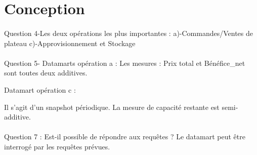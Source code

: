 \section{Conception}

\paragraph{} Question 4-Les deux opérations les plus importantes : 
a)-Commandes/Ventes de plateau
c)-Approvisionnement et Stockage 








\paragraph{} Question 5- Datamarts opération a : 
Les mesures : Prix total et Bénéfice_net sont toutes deux additives.


Datamart opération c :
 


Il s’agit d’un snapshot périodique.
La mesure de capacité restante est semi-additive.

\paragraph{} Question 7 : Est-il  possible de répondre aux requêtes ? 
Le datamart peut être interrogé par les requêtes prévues.
